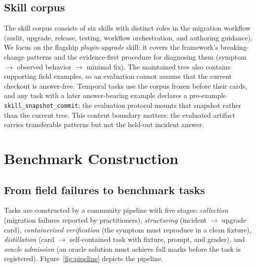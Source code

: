 \documentclass[11pt]{article}
\begin{document}
\begin{table}[t]
\centering
{}
\caption{An example upgrade card. Cards are practitioner-contributed, container-verified, and serve as the single ground truth for both skill distillation and task construction.}
\label{tab:card}
\end{table}

\subsection{Skill corpus}
\label{sec:corpus}

The skill corpus consists of six skills with distinct roles in the migration workflow (audit, upgrade, release, testing, workflow orchestration, and authoring guidance).
We focus on the flagship \emph{plugin-upgrade} skill: it covers the framework's breaking-change patterns and the evidence-first procedure for diagnosing them (symptom $\rightarrow$ observed behavior $\rightarrow$ minimal fix).
The maintained tree also contains supporting field examples, so an evaluation cannot assume that the current checkout is answer-free.
Temporal tasks use the corpus frozen before their cards, and any task with a later answer-bearing example declares a pre-example \texttt{skill\_snapshot\_commit}; the evaluation protocol mounts that snapshot rather than the current tree.
This content boundary matters: the evaluated artifact carries transferable patterns but not the held-out incident answer.

\section{Benchmark Construction}
\label{sec:construction}

\subsection{From field failures to benchmark tasks}
\label{sec:pipeline}

Tasks are constructed by a community pipeline with five stages: \emph{collection} (migration failures reported by practitioners), \emph{structuring} (incident $\rightarrow$ upgrade card), \emph{containerized verification} (the symptom must reproduce in a clean fixture), \emph{distillation} (card $\rightarrow$ self-contained task with fixture, prompt, and grader), and \emph{oracle admission} (an oracle solution must achieve full marks before the task is registered).
Figure~\ref{fig:pipeline} depicts the pipeline.
\end{document}
